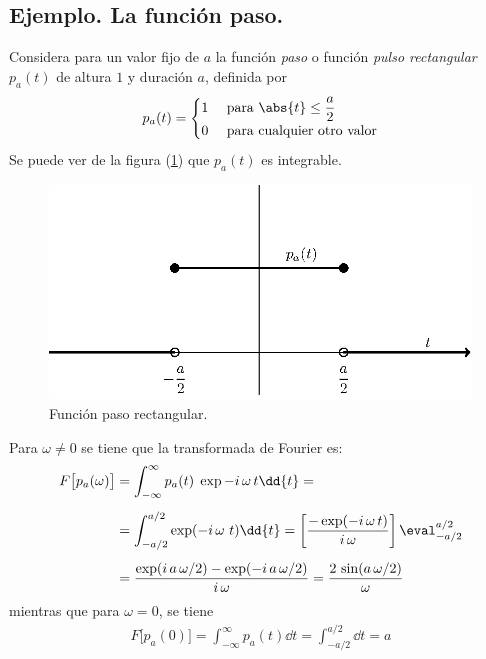 \subsection*{Ejemplo. La función paso.}

Considera para un valor fijo de $a$ la función \emph{paso} o función \emph{pulso rectangular} $p_{a}(t)$ de altura $1$ y duración $a$, definida por
\begin{align}
p_{a}(t) = \begin{cases}
1 & \text{ para } \abs{t} \leq \dfrac{a}{2} \\
0 & \text{ para cualquier otro valor} \end{cases}
\label{eq:ecuacion_06_10_Beerends}
\end{align}
Se puede ver de la figura (\ref{fig:figura_funcionpaso}) que $p_{a}(t)$ es integrable.
\begin{figure}[H]
    \centering
    \includegraphics[scale=1]{Imagenes/funcion_paso.eps}
    \caption{Función paso rectangular.}
    \label{fig:figura_funcionpaso}
\end{figure}
Para $\omega \neq 0$ se tiene que la transformada de Fourier es:
\begin{align*}
F \big[p_{a} (\omega)\big] &= \int_{-\infty}^{\infty} p_{a}(t) \; \exp{-i \, \omega \, t} \dd{t} = \\[0.5em]
&= \int_{-a/2}^{a/2} \exp(-i \, \omega \ t) \dd{t} = \left[ \dfrac{- \exp(- i \, \omega \, t)}{i \, \omega} \right] \eval_{-a/2}^{a/2} \\[0.5em]
&= \dfrac{\exp(i \, a \, \omega/2) - \exp(-i \, a \, \omega/2)}{i \, \omega} = \dfrac{2 \, \sin (a \, \omega/2)}{\omega}
\end{align*}
mientras que para $\omega = 0$, se tiene
\begin{align*}
F \big[p_{a}(0)\big] = \int_{-\infty}^{\infty} p_{a}(t) \dd{t} = \int_{-a/2}^{a/2} \dd{t} = a
\end{align*}
